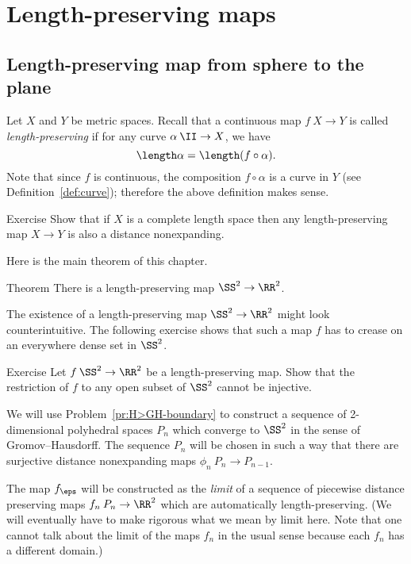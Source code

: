 \chapter{Length-preserving maps}\label{chap:lp}

\section{Length-preserving map from sphere to the plane}

Let $X$ and $Y$ be metric spaces.
Recall that a continuous map $f\:X\to Y$
is called \emph{length-preserving} if for any curve $\alpha\:\II\to X$,
we have 
$$\length\alpha=\length(f\circ\alpha).$$
Note that since $f$ is continuous, the composition $f\circ\alpha$ is a curve in $Y$ (see Definition~\ref{def:curve});
therefore the above definition makes sense.

\begin{thm}{Exercise}\label{LP=>short}
Show that if $X$ is a complete length space then any length-preserving map $X\to Y$
is also a distance nonexpanding.
\end{thm}

Here is the main theorem of this chapter.

\begin{thm}{Theorem}\label{thm:S2->R2}
There is a length-preserving map $\SS^2\to\RR^2$.
\end{thm}


The existence of a length-preserving map $\SS^2\to\RR^2$ might look counterintuitive.
The following exercise shows that such a map $f$ has to crease on an everywhere dense set in $\SS^2$.

\begin{thm}{Exercise}\label{ex:S->R--not-inj}
Let $f\:\SS^2\to\RR^2$ be a length-preserving map. 
Show that the restriction of $f$ to any open subset of $\SS^2$ cannot be injective. 
\end{thm}

 We will use Problem~\ref{pr:H>GH-boundary}
to construct a sequence of 2-dimensional polyhedral spaces $P_n$ which converge to $\SS^2$
in the sense of Gromov--Hausdorff. 
The sequence $P_n$ will be chosen in such a way that there are surjective distance nonexpanding maps $\phi_n\:P_n\to P_{n-1}$.

The map $f_\eps$ will be constructed as the \emph{limit} of a sequence of piecewise distance preserving maps $f_n\:P_n\to\RR^2$ which are automatically length-preserving.
(We will eventually have to make rigorous what we mean by limit here.  Note that one cannot talk about the limit of the maps $f_n$ in the usual sense because each $f_n$ has a different domain.)

